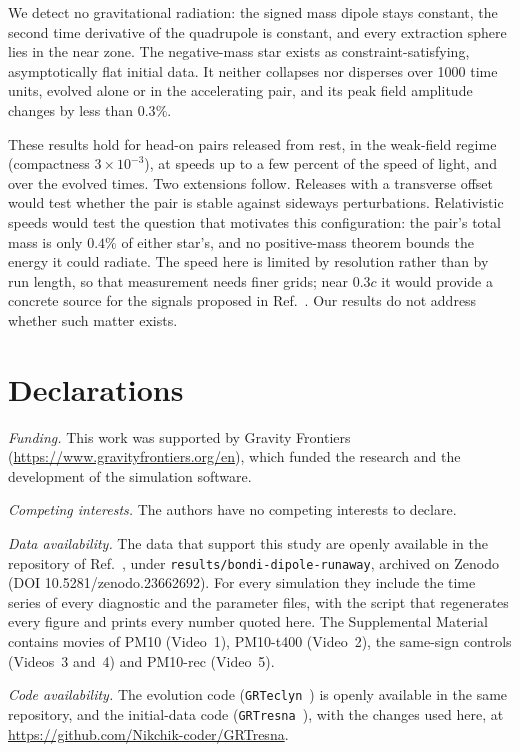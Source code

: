 \documentclass[twocolumn,floatfix,aps,prd,superscriptaddress,nofootinbib]{revtex4-2}
\begin{document}
We detect no gravitational radiation: the signed mass dipole stays constant, the second time derivative of the quadrupole is constant, and every extraction sphere lies in the near zone. The negative-mass star exists as constraint-satisfying, asymptotically flat initial data. It neither collapses nor disperses over 1000 time units, evolved alone or in the accelerating pair, and its peak field amplitude changes by less than $0.3\%$.

These results hold for head-on pairs released from rest, in the weak-field regime (compactness $3\times10^{-3}$), at speeds up to a few percent of the speed of light, and over the evolved times. Two extensions follow. Releases with a transverse offset would test whether the pair is stable against sideways perturbations. Relativistic speeds would test the question that motivates this configuration: the pair's total mass is only $0.4\%$ of either star's, and no positive-mass theorem bounds the energy it could radiate. The speed here is limited by resolution rather than by run length, so that measurement needs finer grids; near $0.3c$ it would provide a concrete source for the signals proposed in Ref.~\cite{trivedi_loeb2026}. Our results do not address whether such matter exists.

\section*{Declarations}
\label{sec:repro}

\textit{Funding.} This work was supported by Gravity Frontiers (\url{https://www.gravityfrontiers.org/en}), which funded the research and the development of the simulation software.

\textit{Competing interests.} The authors have no competing interests to declare.

\textit{Data availability.} The data that support this study are openly available in the repository of Ref.~\cite{repo}, under \texttt{results/bondi-dipole-runaway}, archived on Zenodo (DOI 10.5281/zenodo.23662692). For every simulation they include the time series of every diagnostic and the parameter files, with the script that regenerates every figure and prints every number quoted here. The Supplemental Material contains movies of PM10 (Video~1), PM10-t400 (Video~2), the same-sign controls (Videos~3 and~4) and PM10-rec (Video~5).

\textit{Code availability.} The evolution code (\texttt{GRTeclyn}~\cite{grteclyn,amrex,grchombo}) is openly available in the same repository, and the initial-data code (\texttt{GRTresna}~\cite{grtresna}), with the changes used here, at \url{https://github.com/Nikchik-coder/GRTresna}.
\end{document}
